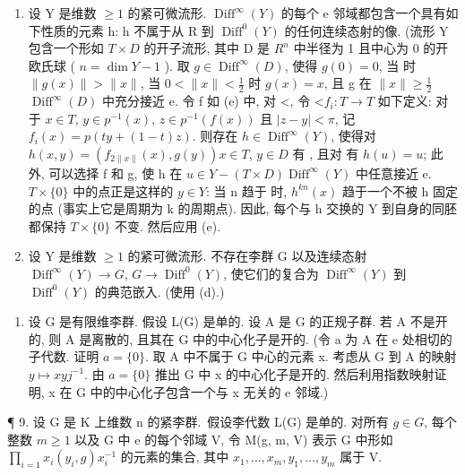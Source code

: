 \begin{enumerate}
\def\labelenumi{(\alph{enumi})}
\setcounter{enumi}{3}
\item
  设 Y 是维数 \(\geqslant1\) 的紧可微流形. \(\operatorname{Diff}^{\infty}(Y)\) 的每个 e 邻域都包含一个具有如下性质的元素 h: h 不属于从 R 到 \(\operatorname{Diff}^{0}(Y)\) 的任何连续态射的像. (流形 Y 包含一个形如 \(T \times D\) 的开子流形, 其中 D 是 \(R^{n}\) 中半径为 1 且中心为 0 的开欧氏球 ( \(n = \dim Y - 1\) ). 取 \(g \in \operatorname{Diff}^{\infty}(D)\), 使得 \(g(0) = 0\), 当  时 \(\|g(x)\| > \|x\|\), 当 \(0 < \|x\| < \frac{1}{2}\) 时 \(g(x) = x\), 且 g 在 \(\|x\| \geqslant \frac{1}{2}\)\(\operatorname{Diff}^{\infty}(D)\) 中充分接近 e. 令 f 如 (e) 中, 对 \textless, 令 {}\textless{}\(f_{i}: T \to T\) 如下定义: 对于 \(x \in T\), \(y \in p^{-1}(x)\), \(z \in p^{-1}(f(x))\) 且 \(|z - y| < \pi\), 记 \(f_{i}(x) = p(ty + (1 - t)z)\). 则存在 \(h \in \operatorname{Diff}^{\infty}(Y)\), 使得对 \(h(x, y) = (f_{2\|x\|}(x), g(y))\)\(x \in T\), \(y \in D\) 有 , 且对  有 \(h(u) = u\); 此外, 可以选择 f 和 g, 使 h 在 \(u \in Y - (T \times D)\)\(\operatorname{Diff}^{\infty}(Y)\) 中任意接近 e. \(T \times \{0\}\) 中的点正是这样的 \(y \in Y\): 当 n 趋于  时, \(h^{kn}(x)\) 趋于一个不被 h 固定的点 (事实上它是周期为 k 的周期点). 因此, 每个与 h 交换的 Y 到自身的同胚都保持 \(T \times \{0\}\) 不变. 然后应用 (e).
\item
  设 Y 是维数 \(\geqslant1\) 的紧可微流形. 不存在李群 G 以及连续态射 \(\operatorname{Diff}^{\infty}(Y)\to G\), \(G\to\operatorname{Diff}^{0}(Y)\), 使它们的复合为 \(\operatorname{Diff}^{\infty}(Y)\) 到 \(\operatorname{Diff}^{0}(Y)\) 的典范嵌入. (使用 (d).)
\end{enumerate}

\begin{enumerate}
\def\labelenumi{\arabic{enumi}.}
\setcounter{enumi}{7}
\tightlist
\item
  设 G 是有限维李群. 假设 L(G) 是单的. 设 A 是 G 的正规子群. 若 A 不是开的, 则 A 是离散的, 且其在 G 中的中心化子是开的. (令 a 为 A 在 e 处相切的子代数. 证明 \(a = \{0\}\). 取 A 中不属于 G 中心的元素 x. 考虑从 G 到 A 的映射 \(y \mapsto xyj^{-1}\). 由 \(a = \{0\}\) 推出 G 中 x 的中心化子是开的. 然后利用指数映射证明, x 在 G 中的中心化子包含一个与 x 无关的 e 邻域.)
\end{enumerate}

¶ 9. 设 G 是 K 上维数 n 的紧李群.~假设李代数 L(G) 是单的. 对所有 \(g \in G\), 每个整数 \(m \geqslant 1\) 以及 G 中 e 的每个邻域 V, 令 M(g, m, V) 表示 G 中形如 \(\prod_{i=1} x_i(y_i, g) x_i^{-1}\) 的元素的集合, 其中 \(x_1, \ldots, x_m, y_1, \ldots, y_m\) 属于 V.

